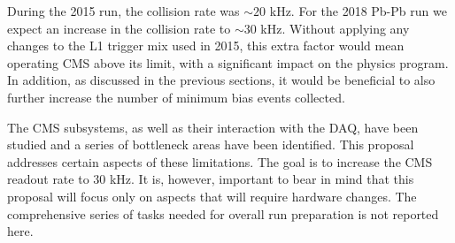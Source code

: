 During the 2015 run, the collision rate was $\sim 20$ kHz. For the 2018 Pb-Pb run we expect an increase in the collision rate to $\sim 30$ kHz. Without applying any changes to the L1 trigger mix used in 2015, this extra factor would mean operating CMS above its limit, with a significant impact on the physics program. In addition, as discussed in the previous sections, it would be beneficial to also further increase the number of minimum bias events collected. 

The CMS subsystems, as well as their interaction with the DAQ, have been studied and a series of bottleneck areas have been identified. This proposal addresses certain aspects of these limitations. The goal is to increase the CMS readout rate to 30 kHz. It is, however, important to bear in mind that this proposal will focus only on aspects that will require hardware changes. The comprehensive series of tasks needed for overall run preparation is not reported here. 

